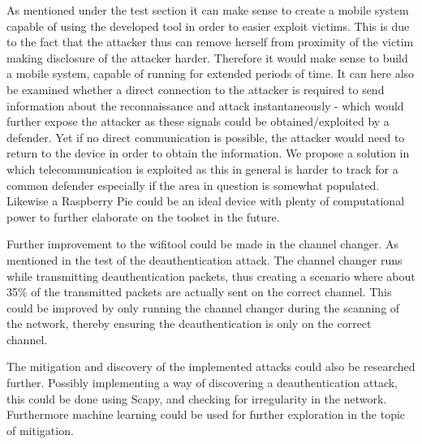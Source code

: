 As mentioned under the test section it can make sense to create a mobile system capable of using the developed tool in order to easier exploit victims. This is due to the fact that the attacker thus can remove herself from proximity of the victim making disclosure of the attacker harder. Therefore it would make sense to build a mobile system, capable of running for extended periods of time. It can here also be examined whether a direct connection to the attacker is required to send information about the reconnaissance and attack instantaneously - which would further expose the attacker as these signals could be obtained/exploited by a defender. Yet if no direct communication is possible, the attacker would need to return to the device in order to obtain the information. We propose a solution in which telecommunication is exploited as this in general is harder to track for a common defender especially if the area in question is somewhat populated. Likewise a Raspberry Pie could be an ideal device with plenty of computational power to further elaborate on the toolset in the future.

Further improvement to the wifitool could be made in the channel changer. As mentioned in the test of the deauthentication attack. The channel changer runs while transmitting deauthentication packets, thus creating a scenario where about 35\% of the transmitted packets are actually sent on the correct channel. This could be improved by only running the channel changer during the scanning of the network, thereby ensuring the deauthentication is only on the correct channel. 

The mitigation and discovery of the implemented attacks could also be researched further. Possibly implementing a way of discovering a deauthentication attack, this could be done using Scapy, and checking for irregularity in the network. Furthermore machine learning could be used for further exploration in the topic of mitigation. 



